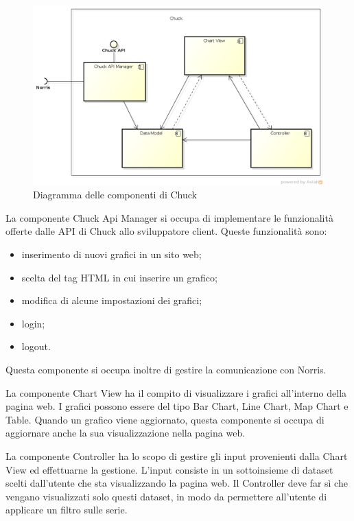 
	\begin{figure}[H]\centering
        \includegraphics[width=\textwidth]{SpecificaTecnica/Pics/componentiChuck}
        \caption{Diagramma delle componenti di Chuck}
    \end{figure}

    		La componente Chuck Api Manager si occupa di implementare le funzionalità offerte dalle API di Chuck allo sviluppatore client. Queste funzionalità sono:
    		\begin{itemize}
						\item inserimento di nuovi grafici in un sito web;
						\item scelta del tag HTML in cui inserire un grafico;
						\item modifica di alcune impostazioni dei grafici;
						\item login;
						\item logout.
			\end{itemize}
    		Questa componente si occupa inoltre di gestire la comunicazione con Norris.
    		
    	La componente Chart View ha il compito di visualizzare i grafici all'interno della pagina web. I grafici possono essere del tipo Bar Chart, Line Chart, Map Chart e Table. Quando un grafico viene aggiornato, questa componente si occupa di aggiornare anche la sua visualizzazione nella pagina web.

    	La componente Controller ha lo scopo di gestire gli input provenienti dalla Chart View ed effettuarne la gestione. L'input consiste in un sottoinsieme di dataset scelti dall'utente che sta visualizzando la pagina web. Il Controller deve far sì che vengano visualizzati solo questi dataset, in modo da permettere all'utente di applicare un filtro sulle serie.

